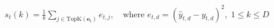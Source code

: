 \documentclass[10pt]{article}
\begin{document}
\begin{align*}s_t(k) = \frac{1}{k} \sum_{j \in \mathrm{TopK}(\mathbf{e}_t)} e_{t, j}, \quad \text{where } e_{t, d} = (\hat{y}_{t, d} - y_{t, d})^2, \; 1 \le k \le D\end{align*}
\end{document}
